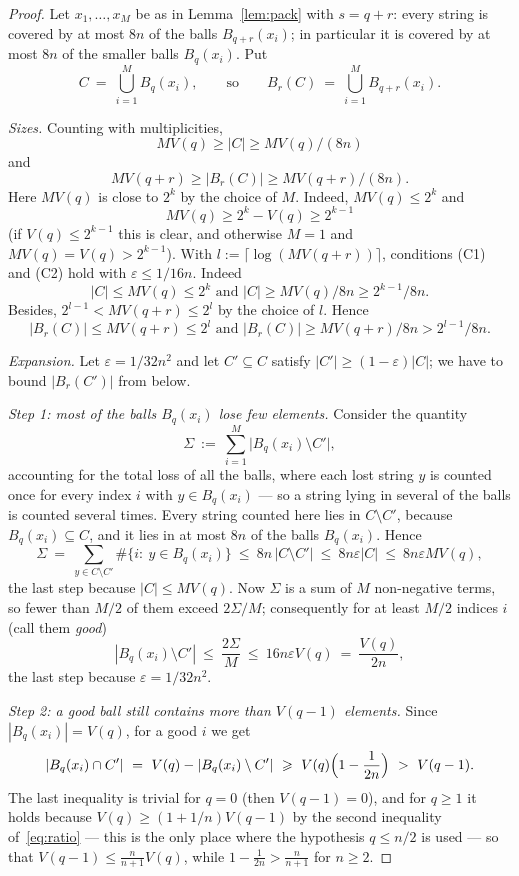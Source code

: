 \documentclass[11pt,a4paper]{article}
\theoremstyle{definition}
\newcommand{\eps}{\varepsilon}
\renewcommand{\le}{\leqslant}
\renewcommand{\ge}{\geqslant}
\begin{document}
\begin{proof}
Let $x_1,\dots,x_M$ be as in Lemma~\ref{lem:pack} with $s=q+r$: every string is
covered by at most $8n$ of the balls $B_{q+r}(x_i)$; in particular it is covered
by at most $8n$ of the smaller balls $B_{q}(x_i)$. Put
\[
  C\ =\ \bigcup_{i=1}^{M}B_q(x_i),\qquad\text{so}\qquad
  B_r(C)\ =\ \bigcup_{i=1}^{M}B_{q+r}(x_i).
\]

\emph{Sizes.} Counting with multiplicities, $$MV(q)\ge|C|\ge MV(q)/(8n)$$ and
$$MV(q+r)\ge|B_r(C)|\ge MV(q+r)/(8n).$$ 
Here $MV(q)$ is close to $2^k$  by the choice of $M$. Indeed, $MV(q)\le2^k$ and
$$MV(q)\ge2^k-V(q)\ge2^{k-1}$$ (if $V(q)\le2^{k-1}$ this is clear, and otherwise
$M=1$ and $MV(q)=V(q)>2^{k-1}$). With $l:=\lceil\log(MV(q+r))\rceil$,
conditions (C1) and (C2) hold with $\eps\le1/16n$. Indeed
$$
|C|\le MV(q)\le 2^k \text{ and } 
|C|\ge MV(q)/8n\ge2^{k-1}/8n.
$$ 
Besides,  $2^{l-1}<MV(q+r)\le 2^l$ by the choice of $l$. Hence 
$$
|B_r(C)|\le MV(q+r)\le 2^l \text{ and } |B_r(C)|\ge MV(q+r)/8n>2^{l-1}/8n.
$$

\emph{Expansion.} Let $\eps=1/32n^2$ and let $C'\subseteq C$ satisfy
$|C'|\ge(1-\eps)|C|$; we have to bound $|B_r(C')|$ from below.

\emph{Step 1: most of the balls $B_q(x_i)$ lose few elements.} Consider the quantity
\[
  \Sigma\ :=\ \sum_{i=1}^{M}\bigl|B_q(x_i)\setminus C'\bigr| ,
\]
accounting for the total loss of all the balls, where 
each lost string $y$ is counted once for every index $i$ with $y\in B_q(x_i)$
--- so a string lying in several of the balls is counted several times.
 Every string counted here lies in
$C\setminus C'$, because $B_q(x_i)\subseteq C$, and it lies in at most $8n$ of
the balls $B_q(x_i)$. Hence
\[
  \Sigma\ =\ \sum_{y\in C\setminus C'}\#\{i:\ y\in B_q(x_i)\}\ \le\
  8n\,|C\setminus C'|\ \le\ 8n\eps|C|\ \le\ 8n\eps MV(q),
\]
the last step because $|C|\le MV(q)$. Now $\Sigma$ is a sum of $M$ non-negative
terms, so fewer than $M/2$ of them exceed $2\Sigma/M$; consequently for at
least $M/2$ indices $i$ (call them \emph{good})
\[
  |B_q(x_i)\setminus C'|\ \le\ \frac{2\Sigma}{M}\ \le\ 16n\eps V(q)\ =\
  \frac{V(q)}{2n},
\]
the last step because  $\eps=1/32n^2$.

\emph{Step 2: a good ball still contains more than $V(q-1)$ elements.} Since
$|B_q(x_i)|=V(q)$, for a good $i$ we get
\[
  |B_q(x_i)\cap C'|\ =\ V(q)-|B_q(x_i)\setminus C'|\ \ge\
  V(q)\Bigl(1-\frac1{2n}\Bigr)\ >\ V(q-1) .
\]
The last inequality is trivial for $q=0$ (then $V(q-1)=0$), and for $q\ge1$ it
holds because $V(q)\ge(1+1/n)V(q-1)$ by the second inequality
of~\eqref{eq:ratio} --- this is the only place where the hypothesis $q\le n/2$
is used --- so that $V(q-1)\le\frac n{n+1}V(q)$, while
$1-\frac1{2n}>\frac n{n+1}$ for $n\ge2$.


\end{proof}
\end{document}
